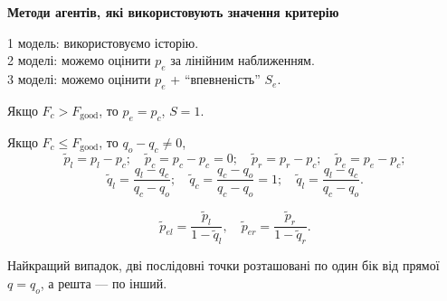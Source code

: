 \documentclass[14pt,handout,utf8]{beamer}
\newcommand{\Xhead}[1]{
 \begin{center}%
      \textbf{#1}%
 \end{center}%
}
\begin{document}

\begin{frame}
  \frametitle{~}

  \Xhead{Методи агентів, які використовують значення критерію}

  1 модель: використовуємо історію. \\
  2 моделі: можемо оцінити $p_e$ за лінійним наближенням. \\
  3 моделі: можемо оцінити $p_e$ + ``впевненість'' $S_e$.

  Якщо
  $F_c > F_\mathrm{good}$, то $p_e = p_c$, $S=1$.

  Якщо
  $F_c \le F_\mathrm{good}$, то $q_o -q_c \ne 0$,
  \[
    \tilde{p}_l = p_l - p_c;
  \quad
  \tilde{p}_c = p_c - p_c = 0;
  \quad
  \tilde{p}_r = p_r - p_c;
  \quad
  \tilde{p}_e = p_e - p_c;
\]
  \begin{equation}
    \tilde{q}_l = \frac{q_l-q_c}{q_c-q_o};
    \quad
    \tilde{q}_c = \frac{q_c-q_o}{q_c-q_o} = 1;
    \quad
    \tilde{q}_l = \frac{q_l-q_c}{q_c-q_o}.
    \label{atu:eq:q_agent_rel}
  \end{equation}

  \begin{equation}
    \tilde{p}_{el} = \frac{\tilde{p}_l}{1-\tilde{q}_l},
    \quad
    \tilde{p}_{er} = \frac{\tilde{p}_r}{1-\tilde{q}_r}.
    \label{atu:eq:pr_ex}
  \end{equation}

  Найкращий випадок,  дві послідовні точки
  розташовані по один бік
  від прямої
  $q = q_o$, а решта --- по інший.


\end{frame}
\end{document}

